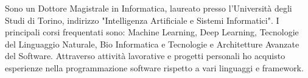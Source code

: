\par{
	Sono un Dottore Magistrale in Informatica, laureato presso l'Università degli Studi di Torino, indirizzo "Intelligenza Artificiale e Sistemi Informatici". I principali corsi frequentati sono: Machine Learning, Deep Learning, Tecnologie del Linguaggio Naturale, Bio Informatica e Tecnologie e Architetture Avanzate del Software.
	Attraverso attività lavorative e progetti personali ho acquisto esperienze nella programmazione software rispetto a vari linguaggi e framework.
}
\smallskip